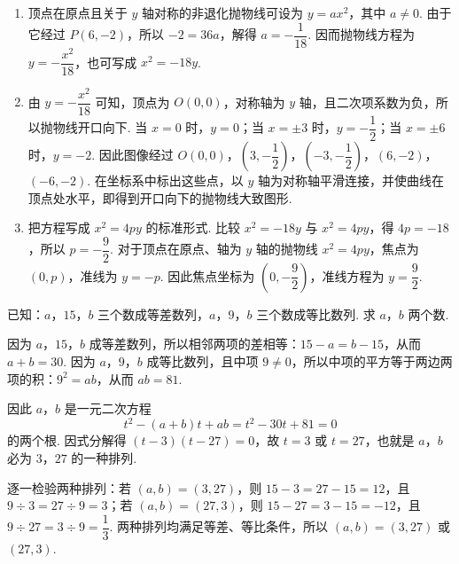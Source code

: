\begin{solution}
\begin{enumerate}
\item 顶点在原点且关于 \(y\) 轴对称的非退化抛物线可设为 \(y=ax^2\)，其中 \(a\ne0\). 由于它经过 \(P(6,-2)\)，所以 \(-2=36a\)，解得 \(a=-\dfrac{1}{18}\). 因而抛物线方程为 \(y=-\dfrac{x^2}{18}\)，也可写成 \(x^2=-18y\).

\item 由 \(y=-\dfrac{x^2}{18}\) 可知，顶点为 \(O(0,0)\)，对称轴为 \(y\) 轴，且二次项系数为负，所以抛物线开口向下. 当 \(x=0\) 时，\(y=0\)；当 \(x=\pm3\) 时，\(y=-\dfrac{1}{2}\)；当 \(x=\pm6\) 时，\(y=-2\). 因此图像经过 \(O(0,0)\)，\(\left(3,-\dfrac{1}{2}\right)\)，\(\left(-3,-\dfrac{1}{2}\right)\)，\((6,-2)\)，\((-6,-2)\). 在坐标系中标出这些点，以 \(y\) 轴为对称轴平滑连接，并使曲线在顶点处水平，即得到开口向下的抛物线大致图形.

\item 把方程写成 \(x^2=4py\) 的标准形式. 比较 \(x^2=-18y\) 与 \(x^2=4py\)，得 \(4p=-18\)，所以 \(p=-\dfrac{9}{2}\). 对于顶点在原点、轴为 \(y\) 轴的抛物线 \(x^2=4py\)，焦点为 \((0,p)\)，准线为 \(y=-p\). 因此焦点坐标为 \(\left(0,-\dfrac{9}{2}\right)\)，准线方程为 \(y=\dfrac{9}{2}\).
\end{enumerate}
\end{solution}

\begin{problem}
已知：\(a\)，\(15\)，\(b\) 三个数成等差数列，\(a\)，\(9\)，\(b\) 三个数成等比数列. 求 \(a\)，\(b\) 两个数.
\end{problem}

\begin{solution}
因为 \(a\)，\(15\)，\(b\) 成等差数列，所以相邻两项的差相等：\(15-a=b-15\)，从而 \(a+b=30\). 因为 \(a\)，\(9\)，\(b\) 成等比数列，且中项 \(9\ne0\)，所以中项的平方等于两边两项的积：\(9^2=ab\)，从而 \(ab=81\).

因此 \(a\)，\(b\) 是一元二次方程
\[
t^2-(a+b)t+ab=t^2-30t+81=0
\]
的两个根. 因式分解得 \(\left(t-3\right)\left(t-27\right)=0\)，故 \(t=3\) 或 \(t=27\)，也就是 \(a\)，\(b\) 必为 \(3\)，\(27\) 的一种排列.

逐一检验两种排列：若 \((a,b)=(3,27)\)，则 \(15-3=27-15=12\)，且 \(9\div3=27\div9=3\)；若 \((a,b)=(27,3)\)，则 \(15-27=3-15=-12\)，且 \(9\div27=3\div9=\dfrac{1}{3}\). 两种排列均满足等差、等比条件，所以 \(\left(a,b\right)=\left(3,27\right)\) 或 \(\left(27,3\right)\).
\end{solution}
